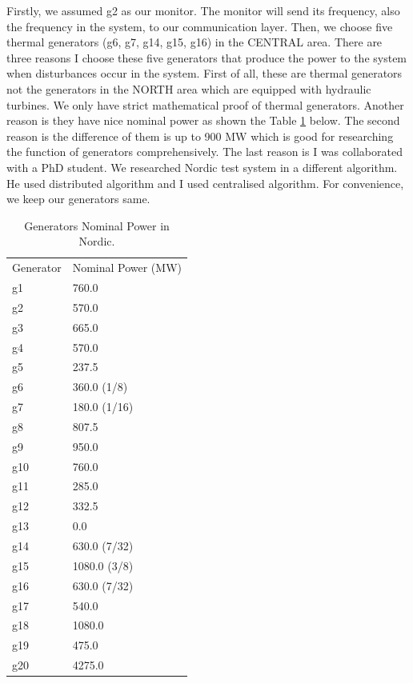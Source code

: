 \documentclass{report}
\begin{document}
Firstly, we assumed g2 as our monitor. The monitor will send its frequency, also the frequency in the system, to our communication layer. Then, we choose five thermal generators  (g6, g7, g14, g15, g16) in the CENTRAL area. There are three reasons I choose these five generators that produce the power to the system when disturbances occur in the system. First of all, these are thermal generators not the generators in the NORTH area which are equipped with hydraulic turbines. We only have strict mathematical proof of thermal generators. Another reason is they have nice nominal power as shown the Table \textcolor{red}{\ref{nominalPower}} below. The second reason is the difference of them is up to 900 MW which is good for researching the function of generators comprehensively. The last reason is I was collaborated with a PhD student. We researched Nordic test system in a different algorithm. He used distributed algorithm and I used centralised algorithm. For convenience, we keep our generators same.\\


\begin{table}[htbp]
\centering
\begin{tabular}{ll}
Generator & Nominal Power (MW) \\
g1        & 760.0              \\
g2        & 570.0              \\
g3        & 665.0              \\
g4        & 570.0              \\
g5        & 237.5              \\
g6        & 360.0 (1/8)        \\
g7        & 180.0 (1/16)       \\
g8        & 807.5              \\
g9        & 950.0              \\
g10       & 760.0              \\
g11       & 285.0              \\
g12       & 332.5              \\
g13       & 0.0                \\
g14       & 630.0 (7/32)       \\
g15       & 1080.0 (3/8)       \\
g16       & 630.0 (7/32)       \\
g17       & 540.0              \\
g18       & 1080.0             \\
g19       & 475.0              \\
g20       & 4275.0             

\end{tabular}
\caption{Generators Nominal Power in Nordic.}
\label{nominalPower}
\end{table}
\end{document}
